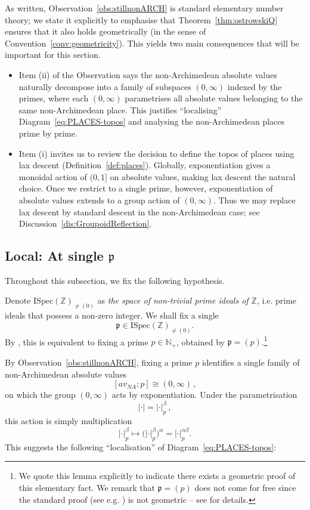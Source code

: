 \documentclass[a4paper, 11pt,reqno]{amsart}
\newcommand{\frap}{\mathfrak{p}}
\newcommand{\ISpec}{\mathrm{ISpec}}
\newcommand{\Z}{\mathbb{Z}}
\newcommand{\N}{\mathbb{N}}
\begin{document}
As written, Observation~\ref{obs:stillnonARCH} is standard elementary number theory;
we state it explicitly to emphasise that Theorem~\ref{thm:ostrowskiQ} ensures that it also holds geometrically (in the sense of Convention~\ref{conv:geometricity}). This yields two main consequences that will be important for this section.
\begin{itemize}
	\item  Item (ii) of the Observation says the non-Archimedean absolute values naturally decompose into a family of subspaces $(0,\infty)$ indexed by the primes, where each $(0,\infty)$ parametrises all absolute values belonging to the same non-Archimedean place.  This justifies ``localising'' Diagram~\eqref{eq:PLACES-topos} and analysing the non-Archimedean places prime by prime. 
	\item Item (i) invites us to review the decision to define the topos of places using lax descent (Definition~\ref{def:places}). Globally, exponentiation gives a monoidal action of $(0,1]$ on absolute values, making lax descent the natural choice. Once we restrict to a single prime, however, exponentiation of absolute values extends to a group action of $(0,\infty)$. Thus we may replace lax descent by standard descent in the non-Archimedean case; see Discussion~\ref{dis:GroupoidReflection}. 
\end{itemize}



\subsection{Local: At single $\frap$}\label{subsec:localNA} Throughout this subsection, we fix the following hypothesis. 

\begin{hypothesis} Denote $\ISpec(\Z)_{\neq (0)}$ as \emph{the space of non-trivial prime ideals of $\Z$}, i.e. prime ideals that possess a non-zero integer. We shall fix a single $$\frap\in\ISpec(\Z)_{\neq (0)}.$$ 
By \cite[Lemma 1.14]{NVOstrowski}, this is equivalent to fixing a prime $p\in\N_+$, obtained by $\frap=(p)$.\footnote{We quote this lemma explicitly to indicate there exists a geometric proof of this elementary fact. We remark that $\frap=(p)$ does not come for free since the standard proof (see e.g. \cite[\S 3.7]{vdW1}) is not geometric -- see \cite[Remark 1.15]{NVOstrowski} for details.} 
	\end{hypothesis}

By Observation~\ref{obs:stillnonARCH}, fixing a prime $p$ identifies a single family of non-Archimedean absolute values 
$$[av_{NA};p]\cong (0,\infty)\,,$$
on which the group $(0,\infty)$ acts by exponentiation. Under the parametrisation
$$|\cdot|=|\cdot|^\beta_p\,,$$
this action is simply multiplication
$$|\cdot|_p^\beta\longmapsto
\bigl(|\cdot|_p^\beta\bigr)^\alpha
=|\cdot|_p^{\alpha\beta}.$$
This suggests the following ``localisation'' of Diagram~\eqref{eq:PLACES-topos}:
\end{document}
